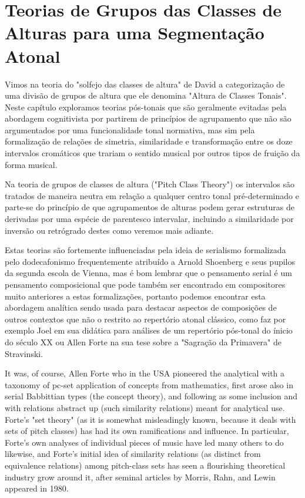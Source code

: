 \documentclass[
	12pt,				%
	openright,			%
	twoside,			%
	a4paper,			%
	english,			%
	french,				%
	spanish,			%
	brazil				%
	]{abntex2}
\begin{document}
\chapter{Teorias de Grupos das Classes de Alturas para uma Segmentação Atonal }
\label{modelos}

Vimos na teoria do "solfejo das classes de altura"\cite[p. 115]{temperley2004cognition} de David  a categorização de uma divisão de grupos de altura que ele denomina "Altura de Classes Tonais"\cite[p. 115]{temperley2004cognition}. Neste capítulo exploramos teorias pós-tonais que são geralmente evitadas pela abordagem cognitivista por partirem de princípios de agrupamento que não são argumentados por uma funcionalidade tonal normativa, mas sim pela formalização de relações de simetria, similaridade e transformação entre os doze intervalos cromáticos que trariam o sentido musical por outros tipos de fruição da forma musical. 

Na teoria de grupos de classes de altura ("Pitch Class Theory") os intervalos são tratados de maneira neutra em relação a qualquer centro tonal pré-determinado e parte-se do princípio de que agrupamentos de alturas podem gerar estruturas de derivadas por uma espécie de parentesco intervalar, incluindo a similaridade por inversão ou retrógrado destes como veremos mais adiante. 

Estas teorias são fortemente influenciadas pela ideia de serialismo formalizada pelo dodecafonismo frequentemente atribuído a Arnold Shoenberg e seus pupilos da segunda escola de Vienna, mas é bom lembrar que o pensamento serial é um pensamento composicional que pode também ser encontrado em compositores muito anteriores a estas formalizações, portanto podemos encontrar esta abordagem analítica sendo usada para destacar aspectos de composições de outros contextos que não o restrito ao repertório atonal clássico, como faz por exemplo Joel  em sua didática para análises de um repertório pós-tonal do ínicio do século XX ou Allen Forte na sua tese sobre a "Sagração da Primavera" de Stravinski\cite{forte1978harmonic}.

\begin{citacao}
It was, of course, Allen Forte who in the USA pioneered the analytical with a taxonomy of pc-set application of concepts from mathematics, first arose also in serial Babbittian types (the concept theory), and following as some inclusion and with relations abstract up (such similarity relations) meant for analytical use. Forte's "set theory" (as it is somewhat misleadingly known, because it deals with sets of pitch classes) has had its own
ramifications and influence. In particular, Forte's own analyses of individual pieces of music have led many others to do likewise, and Forte's initial idea of similarity relations (as distinct from equivalence relations) among pitch-class sets has seen a flourishing theoretical industry grow around it, after seminal articles by Morris, Rahn, and Lewin appeared in 1980.\cite{rahn2004swerve}
\end{citacao}
\end{document}
